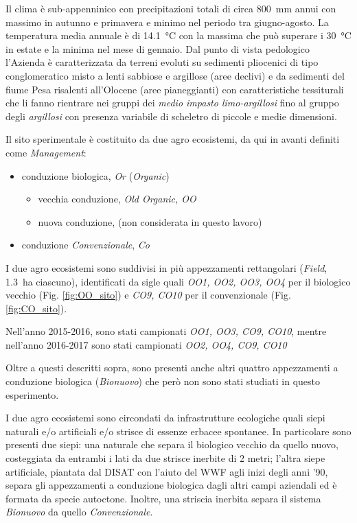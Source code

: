 \documentclass[11pt, a4paper, openright, titlepage, final, language = italian]{book}
\begin{document}
Il clima è sub-appenninico con precipitazioni totali di circa
\SI{800}{\milli\meter} annui con massimo in autunno e primavera e
minimo nel periodo tra giugno-agosto. La temperatura media annuale è
di \SI{14,1}{\celsius} con la massima che può superare i
\SI{30}{\celsius} in estate e la minima nel mese di gennaio. Dal punto di
vista pedologico l’Azienda è caratterizzata da terreni evoluti su
sedimenti pliocenici di tipo conglomeratico misto a lenti sabbiose e
argillose (aree declivi) e da sedimenti del fiume Pesa risalenti
all’Olocene (aree pianeggianti) con caratteristiche tessiturali che li
fanno rientrare nei gruppi dei \textit{medio impasto limo-argillosi}
fino al gruppo degli \textit{argillosi} con presenza variabile di
scheletro di piccole e medie dimensioni.


Il sito sperimentale \`e costituito da due agro ecosistemi, da qui in
avanti definiti come \textit{Management}:
\begin{itemize}
\item conduzione biologica, \emph{Or} (\emph{Organic})
  \begin{itemize}
  \item vecchia conduzione, \emph{Old Organic, OO}
  \item nuova conduzione, (non considerata in questo lavoro)
  \end{itemize}
\item conduzione \emph{Convenzionale}, \emph{Co}
\end{itemize}
I due agro ecosistemi sono suddivisi in pi\`u appezzamenti
rettangolari (\textit{Field}, \SI{1.3}{\hectare} ciascuno),
identificati da sigle quali \emph{OO1, OO2, OO3, OO4} per il biologico
vecchio (Fig. \ref{fig:OO_sito}) e \emph{CO9, CO10} per il
convenzionale (Fig. \ref{fig:CO_sito}). 

Nell'anno 2015-2016, sono stati campionati \emph{OO1, OO3, CO9, CO10},
mentre nell'anno 2016-2017 sono stati campionati \emph{OO2, OO4, CO9,
  CO10}

Oltre a questi descritti sopra, sono presenti anche altri quattro
appezzamenti a conduzione biologica (\textit{Bionuovo}) che per\`o non
sono stati studiati in questo esperimento.

I due agro ecosistemi sono circondati da infrastrutture ecologiche
quali siepi naturali e/o artificiali e/o strisce di essenze erbacee
spontanee. In particolare sono presenti due siepi: una naturale che
separa il biologico vecchio da quello nuovo, costeggiata da entrambi i
lati da due strisce inerbite di 2 metri; l’altra siepe artificiale,
piantata dal DISAT con l’aiuto del WWF agli inizi degli anni ’90,
separa gli appezzamenti a conduzione biologica dagli altri campi
aziendali ed è formata da specie autoctone. Inoltre, una striscia
inerbita separa il sistema \textit{Bionuovo} da quello
\emph{Convenzionale}. 
\end{document}
